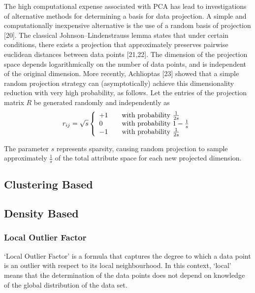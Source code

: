 The high computational expense associated with PCA has lead to investigations of alternative methods for determining a basis for data projection. A simple and computationally inexpensive alternative is the use of a random basis of projection [20]. The classical Johnson–Lindenstrauss lemma states that under certain conditions, there exists a projection that approximately preserves pairwise euclidean distances between data points [21,22]. The dimension of the projection space depends logarithmically on the number of data points, and is independent of the original dimension. More recently, Achlioptas [23] showed that a simple random projection strategy can (asymptotically) achieve this dimensionality reduction with very high probability, as follows. Let the entries of the projection matrix $R$ be generated randomly and independently as
\begin{equation}
r_{ij} = \sqrt{s} \left\{
    \begin{array}{l l}
        +1 & \quad \text{with probability $\frac{1}{2s}$}\\
        0  & \quad \text{with probability ${1-\frac{1}{s}}$}\\
        -1 & \quad \text{with probability $\frac{1}{2s}$}\\
    \end{array}\right.
\end{equation}

The parameter $s$ represents sparsity, causing random projection to sample approximately $\frac{1}{s}$ of the total attribute space for each new projected dimension.

\subsection{Clustering Based}
\label{anomalyDetection:clustering}

\subsection{Density Based}
\label{anomalyDetection:density}

\subsubsection{Local Outlier Factor}
\label{localOutlierFactor}
`Local Outlier Factor' is a formula that captures the degree to which a data
point is an outlier with respect to its local neighbourhood. In this context,
`local' means that the determination of the data points does not depend on
knowledge of the global distribution of the data set.

